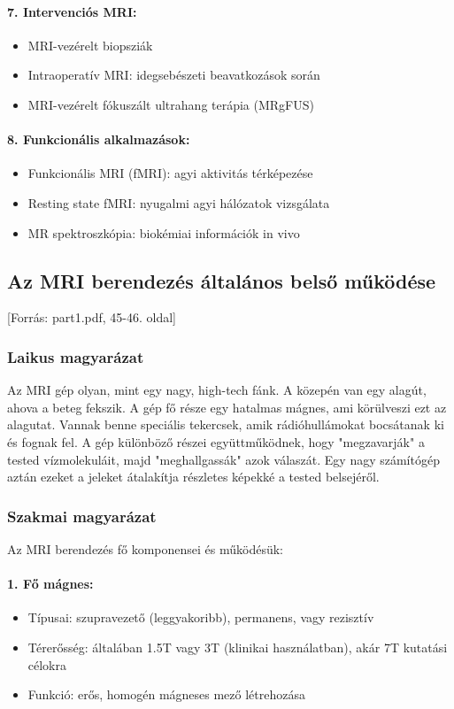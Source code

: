 \documentclass[a4paper,12pt]{article}
\begin{document}
\paragraph{7. Intervenciós MRI:} \begin{itemize} \item MRI-vezérelt biopsziák \item Intraoperatív MRI: idegsebészeti beavatkozások során \item MRI-vezérelt fókuszált ultrahang terápia (MRgFUS) \end{itemize}

\paragraph{8. Funkcionális alkalmazások:} \begin{itemize} \item Funkcionális MRI (fMRI): agyi aktivitás térképezése \item Resting state fMRI: nyugalmi agyi hálózatok vizsgálata \item MR spektroszkópia: biokémiai információk in vivo \end{itemize}

\subsection{Az MRI berendezés általános belső működése} [Forrás: part1.pdf, 45-46. oldal]

\subsubsection{Laikus magyarázat} Az MRI gép olyan, mint egy nagy, high-tech fánk. A közepén van egy alagút, ahova a beteg fekszik. A gép fő része egy hatalmas mágnes, ami körülveszi ezt az alagutat. Vannak benne speciális tekercsek, amik rádióhullámokat bocsátanak ki és fognak fel. A gép különböző részei együttműködnek, hogy "megzavarják" a tested vízmolekuláit, majd "meghallgassák" azok válaszát. Egy nagy számítógép aztán ezeket a jeleket átalakítja részletes képekké a tested belsejéről.

\subsubsection{Szakmai magyarázat} Az MRI berendezés fő komponensei és működésük:

\paragraph{1. Fő mágnes:} \begin{itemize} \item Típusai: szupravezető (leggyakoribb), permanens, vagy rezisztív \item Térerősség: általában 1.5T vagy 3T (klinikai használatban), akár 7T kutatási célokra \item Funkció: erős, homogén mágneses mező létrehozása \end{itemize}
\end{document}
